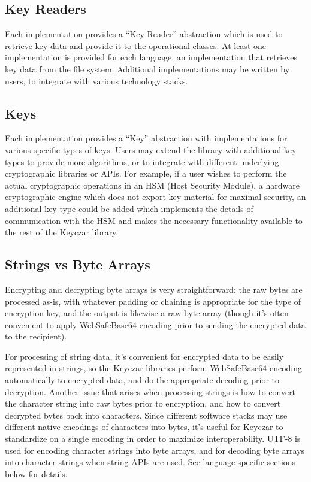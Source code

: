 \documentclass{llncs}
\begin{document}
\subsection{Key Readers}

Each implementation provides a ``Key Reader'' abstraction which is
used to retrieve key data and provide it to the operational classes.
At least one implementation is provided for each language, an
implementation that retrieves key data from the file system.
Additional implementations may be written by users, to integrate with
various technology stacks.

\subsection {Keys}

Each implementation provides a ``Key'' abstraction with
implementations for various specific types of keys.  Users may extend
the library with additional key types to provide more algorithms, or
to integrate with different underlying cryptographic libraries or
APIs.  For example, if a user wishes to perform the actual
cryptographic operations in an HSM (Host Security Module), a hardware
cryptographic engine which does not export key material for maximal
security, an additional key type could be added which implements the
details of communication with the HSM and makes the necessary
functionality available to the rest of the Keyczar library.
  
\subsection{Strings vs Byte Arrays}

Encrypting and decrypting byte arrays is very straightforward:  the
raw bytes are processed as-is, with whatever padding or chaining is
appropriate for the type of encryption key, and the output is likewise
a raw byte array (though it's often convenient to apply WebSafeBase64
encoding prior to sending the encrypted data to the recipient).

For processing of string data, it's convenient for encrypted data to
be easily represented in strings, so the Keyczar libraries perform
WebSafeBase64 encoding automatically to encrypted data, and do the
appropriate decoding prior to decryption.  Another issue that arises
when processing strings is how to convert the character string into
raw bytes prior to encryption, and how to convert decrypted bytes back
into characters.  Since different software stacks may use different
native encodings of characters into bytes, it's useful for Keyczar to
standardize on a single encoding in order to maximize
interoperability.  UTF-8 is used for encoding character strings into
byte arrays, and for decoding byte arrays into character strings when
string APIs are used.  See language-specific sections below for
details.
\end{document}
